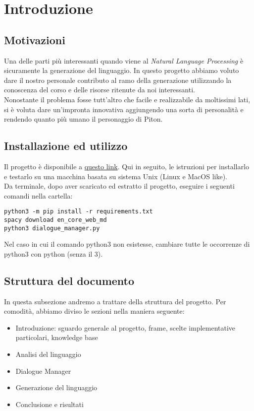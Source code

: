 \section{Introduzione}

\subsection{Motivazioni}
Una delle parti più interessanti quando viene al \textit{Natural Language Processing} è sicuramente la generazione del linguaggio. In questo progetto abbiamo voluto dare il nostro personale contributo al ramo della generazione utilizzando la conoscenza del corso e delle risorse ritenute da noi interessanti.
\\
Nonostante il problema fosse tutt'altro che facile e realizzabile da moltissimi lati, si è voluta dare un'impronta innovativa aggiungendo una sorta di personalità e rendendo quanto più umano il personaggio di Piton.

\subsection{Installazione ed utilizzo}
Il progetto è disponibile a \href{https://github.com/federicotorrielli/pitonNLG}{questo link}. Qui in seguito, le istruzioni per installarlo e testarlo su una macchina basata su sistema Unix (Linux e MacOS like).
\\
Da terminale, dopo aver scaricato ed estratto il progetto, eseguire i seguenti comandi nella cartella:
\lstset{
  language=bash,
  basicstyle=\ttfamily
}
\begin{lstlisting}
python3 -m pip install -r requirements.txt
spacy download en_core_web_md
python3 dialogue_manager.py
\end{lstlisting}
Nel caso in cui il comando python3 non esistesse, cambiare tutte le occorrenze di python3 con python (senza il 3).

\subsection{Struttura del documento}
In questa subsezione andremo a trattare della struttura del progetto. Per comodità, abbiamo diviso le sezioni nella maniera seguente:
\begin{itemize}
    \item Introduzione: sguardo generale al progetto, frame, scelte implementative particolari, knowledge base
    \item Analisi del linguaggio
    \item Dialogue Manager
    \item Generazione del linguaggio
    \item Conclusione e risultati
\end{itemize}

